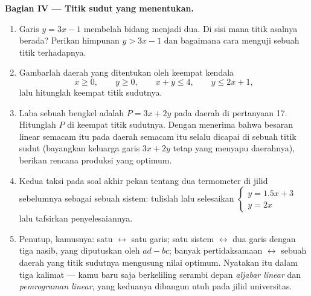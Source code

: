 \begin{problem}
\medskip
\noindent\textbf{Bagian IV --- Titik sudut yang menentukan.}
\begin{enumerate}[resume]
  \item Garis $y = 3x - 1$ membelah bidang menjadi dua. Di sisi
        mana titik asalnya berada? Perikan himpunan
        $y > 3x - 1$ dan bagaimana cara menguji sebuah titik terhadapnya.
  \item Gambarlah daerah yang ditentukan oleh keempat kendala
        \[
        x \geq 0, \qquad y \geq 0, \qquad x + y \leq 4,
        \qquad y \leq 2x + 1,
        \]
        lalu hitunglah keempat titik sudutnya.
  \item Laba sebuah bengkel adalah $P = 3x + 2y$ pada daerah di
        pertanyaan 17. Hitunglah $P$ di keempat titik sudutnya. Dengan
        menerima bahwa  besaran linear semacam itu pada daerah
        semacam itu selalu dicapai di sebuah titik sudut (bayangkan
        keluarga garis $3x + 2y$ tetap yang menyapu daerahnya), berikan
        rencana produksi yang optimum.
  \item Kedua taksi pada soal akhir pekan tentang dua termometer di jilid
        sebelumnya sebagai sebuah sistem: tulislah lalu selesaikan
        $\begin{cases} y = 1.5x + 3 \\ y = 2x \end{cases}$ lalu
        tafsirkan penyelesaiannya.
  \item Penutup, kamusnya: satu  $\leftrightarrow$
        satu garis; satu sistem $\leftrightarrow$ dua garis dengan
        tiga nasib, yang diputuskan oleh $ad - bc$; banyak pertidaksamaan
        $\leftrightarrow$ sebuah daerah yang titik sudutnya mengusung
        nilai optimum. Nyatakan itu dalam tiga kalimat --- kamu baru saja
        berkeliling serambi depan \emph{aljabar linear} dan
        \emph{pemrograman linear}, yang keduanya dibangun utuh pada
        jilid universitas.

\end{enumerate}
\end{problem}
